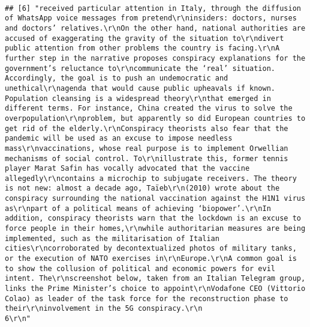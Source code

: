 \documentclass[
]{book}
\begin{document}
\begin{verbatim}
                                                                                                                                                                                                                                                                                                                                                                                                                                                                                                                                                                                           
## [6] "received particular attention in Italy, through the diffusion of WhatsApp voice messages from pretend\r\ninsiders: doctors, nurses and doctors’ relatives.\r\nOn the other hand, national authorities are accused of exaggerating the gravity of the situation to\r\ndivert public attention from other problems the country is facing.\r\nA further step in the narrative proposes conspiracy explanations for the government’s reluctance to\r\ncommunicate the ‘real’ situation. Accordingly, the goal is to push an undemocratic and unethical\r\nagenda that would cause public upheavals if known. Population cleansing is a widespread theory\r\nthat emerged in different terms. For instance, China created the virus to solve the overpopulation\r\nproblem, but apparently so did European countries to get rid of the elderly.\r\nConspiracy theorists also fear that the pandemic will be used as an excuse to impose needless mass\r\nvaccinations, whose real purpose is to implement Orwellian mechanisms of social control. To\r\nillustrate this, former tennis player Marat Safin has vocally advocated that the vaccine allegedly\r\ncontains a microchip to subjugate receivers. The theory is not new: almost a decade ago, Taïeb\r\n(2010) wrote about the conspiracy surrounding the national vaccination against the H1N1 virus as\r\npart of a political means of achieving ‘biopower’.\r\nIn addition, conspiracy theorists warn that the lockdown is an excuse to force people in their homes,\r\nwhile authoritarian measures are being implemented, such as the militarisation of Italian cities\r\ncorroborated by decontextualized photos of military tanks, or the execution of NATO exercises in\r\nEurope.\r\nA common goal is to show the collusion of political and economic powers for evil intent. The\r\nscreenshot below, taken from an Italian Telegram group, links the Prime Minister’s choice to appoint\r\nVodafone CEO (Vittorio Colao) as leader of the task force for the reconstruction phase to their\r\ninvolvement in the 5G conspiracy.\r\n                                                                                                    6\r\n"                                                                                                                                                                                                                                                                                                                                                                                                                                                                                                                                                                                                                                        
\end{verbatim}
\end{document}

